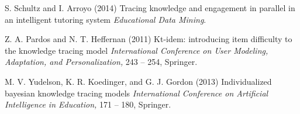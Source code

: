 \documentclass[12pt,a4paper,oneside]{report}
\begin{document}
\begin{thebibliography}{9}
		 S. Schultz and I. Arroyo (2014)
		\newblock Tracing knowledge and engagement in parallel in an intelligent tutoring system
		\newblock \emph{Educational Data Mining}.
		
		 Z. A. Pardos and N. T. Heffernan (2011)
		\newblock Kt-idem: introducing item difficulty to the knowledge tracing model
		\newblock \emph{International Conference on User Modeling, Adaptation, and Personalization,} 243 -- 254, Springer.
		
		 M. V. Yudelson, K. R. Koedinger, and G. J. Gordon (2013)
		\newblock Individualized bayesian knowledge tracing models
		\newblock \emph{International Conference on Artificial Intelligence in Education,} 171 -- 180, Springer.
\end{thebibliography}
\end{document}
